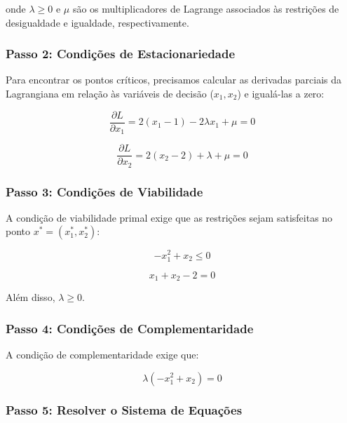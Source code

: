 \documentclass[a4paper, 12pt]{article}
\begin{document}
onde $\lambda \geq 0$ e $\mu$ são os multiplicadores de Lagrange associados às restrições de desigualdade e igualdade, respectivamente.

\subsubsection{Passo 2: Condições de Estacionariedade}

Para encontrar os pontos críticos, precisamos calcular as derivadas parciais da Lagrangiana em relação às variáveis de decisão ($x_1, x_2$) e igualá-las a zero:

\begin{equation*}
    \frac{\partial L}{\partial x_1} = 2(x_1 - 1) - 2\lambda x_1 + \mu = 0
\end{equation*}

\begin{equation*}
    \frac{\partial L}{\partial x_2} = 2(x_2 - 2) + \lambda + \mu = 0
\end{equation*}

\subsubsection{Passo 3: Condições de Viabilidade}

A condição de viabilidade primal exige que as restrições sejam satisfeitas no ponto $x^* = (x_1^*, x_2^*)$:

\begin{equation*}
    -x_1^2 + x_2 \leq 0
\end{equation*}

\begin{equation*}
    x_1 + x_2 - 2 = 0
\end{equation*}

Além disso, $\lambda \geq 0$.

\subsubsection{Passo 4: Condições de Complementaridade}

A condição de complementaridade exige que:

\begin{equation*}
    \lambda (-x_1^2 + x_2) = 0
\end{equation*}

\subsubsection{Passo 5: Resolver o Sistema de Equações}
\end{document}

